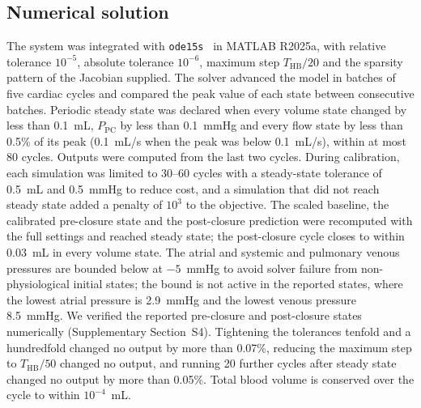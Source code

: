 \documentclass{article}
\begin{document}
\FloatBarrier
\subsection{Numerical solution}
\label{sec:numerics}
The system was integrated with \texttt{ode15s}~\cite{Shampine1997} in MATLAB R2025a, with relative tolerance $10^{-5}$, absolute tolerance $10^{-6}$, maximum step $T_{\mathrm{HB}}/20$ and the sparsity pattern of the Jacobian supplied. The solver advanced the model in batches of five cardiac cycles and compared the peak value of each state between consecutive batches. Periodic steady state was declared when every volume state changed by less than 0.1~mL, $P_{\mathrm{PC}}$ by less than 0.1~mmHg and every flow state by less than 0.5\% of its peak (0.1~mL/s when the peak was below 0.1~mL/s), within at most 80 cycles. Outputs were computed from the last two cycles. During calibration, each simulation was limited to 30--60 cycles with a steady-state tolerance of 0.5~mL and 0.5~mmHg to reduce cost, and a simulation that did not reach steady state added a penalty of $10^{3}$ to the objective. The scaled baseline, the calibrated pre-closure state and the post-closure prediction were recomputed with the full settings and reached steady state; the post-closure cycle closes to within 0.03~mL in every volume state. The atrial and systemic and pulmonary venous pressures are bounded below at $-5$~mmHg to avoid solver failure from non-physiological initial states; the bound is not active in the reported states, where the lowest atrial pressure is 2.9~mmHg and the lowest venous pressure 8.5~mmHg. We verified the reported pre-closure and post-closure states numerically (Supplementary Section~S4). Tightening the tolerances tenfold and a hundredfold changed no output by more than 0.07\%, reducing the maximum step to $T_{\mathrm{HB}}/50$ changed no output, and running 20 further cycles after steady state changed no output by more than 0.05\%. Total blood volume is conserved over the cycle to within $10^{-4}$~mL.

\FloatBarrier
\end{document}

